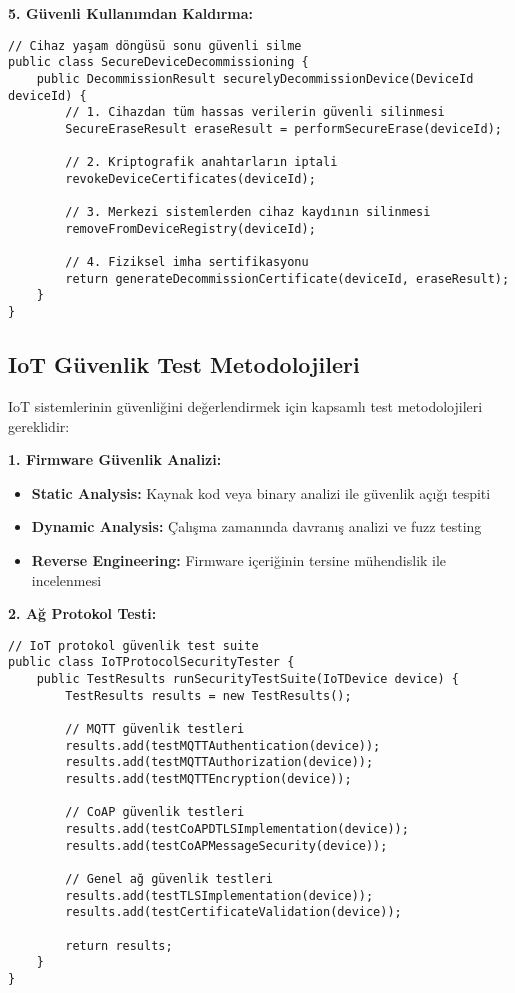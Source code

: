 \textbf{5. Güvenli Kullanımdan Kaldırma:}
\begin{lstlisting}[breaklines=true,basicstyle=\ttfamily\footnotesize]
// Cihaz yaşam döngüsü sonu güvenli silme
public class SecureDeviceDecommissioning {
    public DecommissionResult securelyDecommissionDevice(DeviceId deviceId) {
        // 1. Cihazdan tüm hassas verilerin güvenli silinmesi
        SecureEraseResult eraseResult = performSecureErase(deviceId);
        
        // 2. Kriptografik anahtarların iptali
        revokeDeviceCertificates(deviceId);
        
        // 3. Merkezi sistemlerden cihaz kaydının silinmesi
        removeFromDeviceRegistry(deviceId);
        
        // 4. Fiziksel imha sertifikasyonu
        return generateDecommissionCertificate(deviceId, eraseResult);
    }
}
\end{lstlisting}

\subsection{IoT Güvenlik Test Metodolojileri}

IoT sistemlerinin güvenliğini değerlendirmek için kapsamlı test metodolojileri gereklidir:

\textbf{1. Firmware Güvenlik Analizi:}
\begin{itemize}
    \item \textbf{Static Analysis:} Kaynak kod veya binary analizi ile güvenlik açığı tespiti
    \item \textbf{Dynamic Analysis:} Çalışma zamanında davranış analizi ve fuzz testing
    \item \textbf{Reverse Engineering:} Firmware içeriğinin tersine mühendislik ile incelenmesi
\end{itemize}

\textbf{2. Ağ Protokol Testi:}
\begin{lstlisting}[breaklines=true,basicstyle=\ttfamily\footnotesize]
// IoT protokol güvenlik test suite
public class IoTProtocolSecurityTester {
    public TestResults runSecurityTestSuite(IoTDevice device) {
        TestResults results = new TestResults();
        
        // MQTT güvenlik testleri
        results.add(testMQTTAuthentication(device));
        results.add(testMQTTAuthorization(device));
        results.add(testMQTTEncryption(device));
        
        // CoAP güvenlik testleri
        results.add(testCoAPDTLSImplementation(device));
        results.add(testCoAPMessageSecurity(device));
        
        // Genel ağ güvenlik testleri
        results.add(testTLSImplementation(device));
        results.add(testCertificateValidation(device));
        
        return results;
    }
}
\end{lstlisting}

